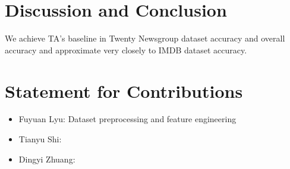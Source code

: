 \documentclass[11pt]{scrartcl}
\begin{document}
\section{Discussion and Conclusion}
We achieve TA's baseline in Twenty Newsgroup dataset accuracy and overall accuracy and approximate very closely to IMDB dataset accuracy.

\section{Statement for Contributions}
\begin{itemize}
	\item Fuyuan Lyu: Dataset preprocessing and feature engineering
	\item Tianyu Shi:
	\item Dingyi Zhuang:
\end{itemize}

\newpage


\end{document}
